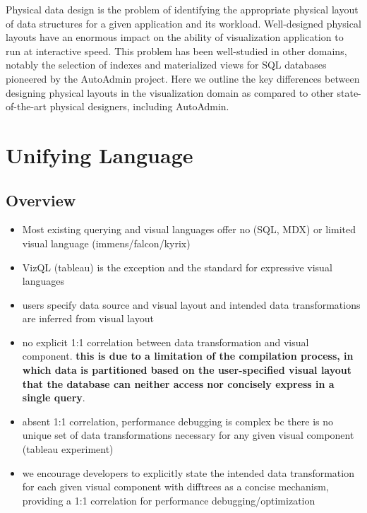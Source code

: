 Physical data design is the problem of identifying the appropriate physical layout of data structures for a given application and its workload.  Well-designed physical layouts have an enormous impact on the ability of visualization application to run at interactive speed. This problem has been well-studied in other domains, notably the selection of indexes and materialized views for SQL databases pioneered by the AutoAdmin project. Here we outline the key differences between designing physical layouts in the visualization domain as compared to other state-of-the-art physical designers, including AutoAdmin. 

\section{Unifying Language} 
\subsection{Overview}
\begin{itemize}
\item Most existing querying and visual languages offer no (SQL, MDX) or limited visual language (immens/falcon/kyrix)
\item VizQL (tableau) is the exception and the standard for expressive visual languages
\item users specify data source and visual layout and intended data transformations are inferred from visual layout
\item no explicit 1:1 correlation between data transformation and visual component. \textbf{this is due to a limitation of the compilation process, in which data is partitioned based on the user-specified visual layout that the database can neither access nor concisely express in a single query}.
\item absent 1:1 correlation, performance debugging is complex bc there is no unique set of data transformations necessary for any given visual component (tableau experiment)
\item we encourage developers to explicitly state the intended data transformation for each given visual component with difftrees as a concise mechanism, providing a 1:1 correlation for performance debugging/optimization	
\end{itemize}


